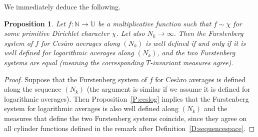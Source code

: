 \documentclass[11pt]{amsart}
\newtheorem{proposition}[lemma]{Proposition}
\theoremstyle{definition}
\newcommand{\N}{{\mathbb N}}
\newcommand{\U}{{\mathbb U}}
\begin{document}
We immediately deduce the following. 	
\begin{proposition}\label{P:ceslog'}
	Let $f\colon \N\to \U$ be a multiplicative function such that $f\sim\chi$ for some primitive Dirichlet character $\chi$. Let also $N_k\to\infty$. Then the Furstenberg system of $f$ for Ces\`aro averages along $(N_k)$ is well defined if and only if it is well defined for logarithmic averages along $(N_k)$, and the two Furstenberg systems are equal (meaning the corresponding $T$-invariant measures agree).
\end{proposition}
\begin{proof}
	Suppose that the Furstenberg system of $f$ for Ces\`aro averages is defined along the sequence  $(N_k)$ (the argument is similar if we assume it is defined for logarithmic averages).
	Then Proposition~\ref{P:ceslog} implies that the Furstenberg system for logarithmic averages is also well defined along $(N_k)$ and the  measures that define  the two Furstenberg systems coincide, since they agree on all cylinder functions defined in the remark after Definition~\ref{D:sequencespace}.
\end{proof}
\end{document}
